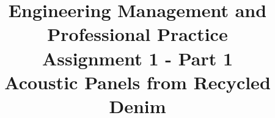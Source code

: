 \documentclass[conference]{IEEEtran}
\begin{document}
\title{Engineering Management and Professional Practice \\
Assignment 1 - Part 1 \\
Acoustic Panels from Recycled Denim \\
}

\author{
}


\maketitle





\newpage


\end{document}
